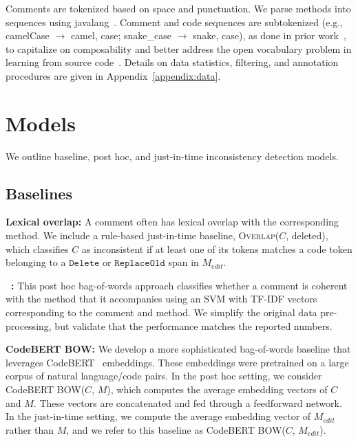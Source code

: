 \documentclass[letterpaper]{article} %
\newcommand{\CodeIn}[1]{{\ifmmode{\mathtt{#1}}\else$\mathtt{#1}$\fi}}
\newcommand{\Comment}{$C$}
\newcommand{\NewCode}{$M$}
\newcommand{\Posthoc}{post hoc}
\newcommand{\JustInTime}{just-in-time}
\newcommand{\EditCode}{$M_{edit}$}
\newcommand{\HasOverlap}{\textsc{Overlap}}
\newcommand{\DeletedCode}{deleted}
\newcommand{\Bert}{CodeBERT BOW}
\newcommand{\PosthocBert}{\Bert{}(\Comment{}, \NewCode{})}
\newcommand{\JustInTimeBert}{\Bert{}(\Comment{}, \EditCode{})}
\begin{document}
Comments are tokenized based on space and punctuation. We parse methods into sequences using javalang~\cite{javalang}. Comment and code sequences are subtokenized (e.g., camelCase $\rightarrow$ camel, case; snake\_case $\rightarrow$ snake, case), as done in prior
work~\cite{Alon2019Code2Seq,FernandesSummarization}, to capitalize on composability and better address the open vocabulary problem in learning from source code~\cite{CvitovicOpenVocab}.
Details on data statistics, filtering, and annotation procedures are given in Appendix~\ref{appendix:data}.



\section{Models}
We outline baseline, \Posthoc{}, and \JustInTime{} inconsistency detection models.

\subsection{Baselines}
\label{sec:baselines}
\noindent\textbf{Lexical overlap:} A comment often has lexical overlap with the corresponding method. We include a rule-based \JustInTime{} baseline, \HasOverlap{}(\Comment{}, \DeletedCode{}), which classifies \Comment{} as inconsistent if at least one of its tokens matches a code token belonging to a \CodeIn{Delete} or \CodeIn{ReplaceOld} span in \EditCode{}.

\noindent\textbf{\citeauthor{Corazza18}~:} This \Posthoc{} bag-of-words approach classifies whether a comment is coherent with the method that it accompanies using an SVM with TF-IDF vectors corresponding to the comment and method. We simplify the original data pre-processing, but validate that the performance matches the reported numbers.

\noindent\textbf{\Bert{}:} We develop a more sophisticated bag-of-words baseline that leverages CodeBERT~\cite{Feng2020CodeBERTAP} embeddings. These embeddings were pretrained on a large corpus of natural language/code pairs. In the \Posthoc{} setting, we consider \PosthocBert{}, which computes the average embedding vectors of \Comment{} and \NewCode{}. These vectors are concatenated and fed through a feedforward network. In the \JustInTime{} setting, we compute the average embedding vector of \EditCode{} rather than \NewCode{}, and we refer to this baseline as \JustInTimeBert{}.
\end{document}
